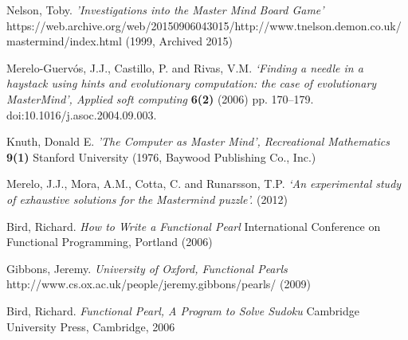 \documentclass[12pt]{article}  %
\theoremstyle{definition}
\theoremstyle{remark}
\begin{document}
\begin{thebibliography}{99}
Nelson, Toby.
{\em 'Investigations into the Master Mind Board Game'}
https://web.archive.org/web/20150906043015/http://www.tnelson.demon.co.uk/mastermind/index.html
(1999, Archived 2015)

Merelo-Guervós, J.J., Castillo, P. and Rivas, V.M. 
{\em ‘Finding a needle in a haystack using hints and evolutionary computation: the case of evolutionary MasterMind’, Applied soft computing}
{\bf  6(2)}
(2006) pp. 170–179. 
doi:10.1016/j.asoc.2004.09.003.

Knuth, Donald E. 
{\em 'The Computer as Master Mind', Recreational Mathematics}
{\bf 9(1)}
Stanford University
(1976, Baywood Publishing Co., Inc.)

 Merelo, J.J., Mora, A.M., Cotta, C. and Runarsson, T.P. 
{\em ‘An experimental study of exhaustive solutions for the Mastermind puzzle’.}
(2012) 

Bird, Richard.
{\em How to Write a Functional Pearl}
International Conference on Functional Programming, Portland
(2006)

Gibbons, Jeremy.
{\em University of Oxford, Functional Pearls}
http://www.cs.ox.ac.uk/people/jeremy.gibbons/pearls/
(2009)

Bird, Richard.
{\em Functional Pearl, A Program to Solve Sudoku}
Cambridge University Press, Cambridge, 2006



\end{thebibliography}
\end{document}
